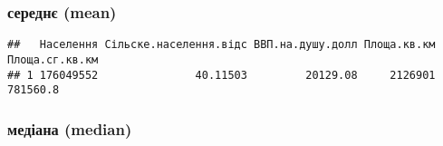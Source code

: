 \documentclass[
]{article}
\newenvironment{Shaded}{\begin{snugshade}}{\end{snugshade}}
\newcommand{\CommentTok}[1]{\textcolor[rgb]{0.56,0.35,0.01}{\textit{#1}}}
\newcommand{\DataTypeTok}[1]{\textcolor[rgb]{0.13,0.29,0.53}{#1}}
\newcommand{\KeywordTok}[1]{\textcolor[rgb]{0.13,0.29,0.53}{\textbf{#1}}}
\newcommand{\NormalTok}[1]{#1}
\newcommand{\OperatorTok}[1]{\textcolor[rgb]{0.81,0.36,0.00}{\textbf{#1}}}
\newcommand{\OtherTok}[1]{\textcolor[rgb]{0.56,0.35,0.01}{#1}}
\newcommand{\StringTok}[1]{\textcolor[rgb]{0.31,0.60,0.02}{#1}}
\begin{document}
\hypertarget{ux441ux435ux440ux435ux434ux43dux454-mean}{%
\subsubsection{середнє
(mean)}\label{ux441ux435ux440ux435ux434ux43dux454-mean}}

\begin{Shaded}
\end{Shaded}

\begin{verbatim}
##   Населення Сільске.населення.відс ВВП.на.душу.долл Площа.кв.км Площа.сг.кв.км
## 1 176049552               40.11503         20129.08     2126901       781560.8
\end{verbatim}

\hypertarget{ux43cux435ux434ux456ux430ux43dux430-median}{%
\subsubsection{медіана
(median)}\label{ux43cux435ux434ux456ux430ux43dux430-median}}
\end{document}

